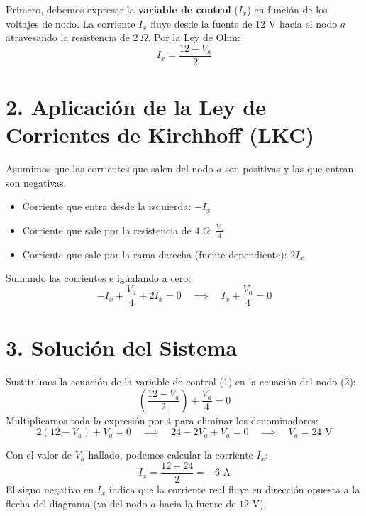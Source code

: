 \documentclass[12pt, a4paper]{article}
\begin{document}
Primero, debemos expresar la \textbf{variable de control} ($I_x$) en función de los voltajes de nodo. La corriente $I_x$ fluye desde la fuente de $12\text{ V}$ hacia el nodo $a$ atravesando la resistencia de $2\ \Omega$. Por la Ley de Ohm:
\begin{equation}
    I_x = \frac{12 - V_a}{2}
\end{equation}

\section*{2. Aplicación de la Ley de Corrientes de Kirchhoff (LKC)}
Asumimos que las corrientes que salen del nodo $a$ son positivas y las que entran son negativas. 
\begin{itemize}
    \item Corriente que entra desde la izquierda: $-I_x$
    \item Corriente que sale por la resistencia de $4\ \Omega$: $\frac{V_a}{4}$
    \item Corriente que sale por la rama derecha (fuente dependiente): $2I_x$
\end{itemize}

Sumando las corrientes e igualando a cero:
\begin{equation}
    -I_x + \frac{V_a}{4} + 2I_x = 0 \quad \implies \quad I_x + \frac{V_a}{4} = 0
\end{equation}

\section*{3. Solución del Sistema}
Sustituimos la ecuación de la variable de control (1) en la ecuación del nodo (2):
\begin{equation*}
    \left( \frac{12 - V_a}{2} \right) + \frac{V_a}{4} = 0
\end{equation*}
Multiplicamos toda la expresión por $4$ para eliminar los denominadores:
\begin{equation*}
    2(12 - V_a) + V_a = 0 \quad \implies \quad 24 - 2V_a + V_a = 0 \quad \implies \quad V_a = 24\text{ V}
\end{equation*}

Con el valor de $V_a$ hallado, podemos calcular la corriente $I_x$:
\begin{equation}
    I_x = \frac{12 - 24}{2} = -6\text{ A}
\end{equation}
El signo negativo en $I_x$ indica que la corriente real fluye en dirección opuesta a la flecha del diagrama (va del nodo $a$ hacia la fuente de $12\text{ V}$).
\end{document}
